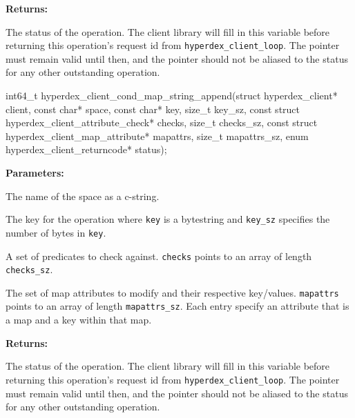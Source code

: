 \noindent\textbf{Returns:}
\begin{description}[labelindent=\widthof{{\texttt{status}}},leftmargin=*,noitemsep,nolistsep,align=right]
\item[\texttt{status}] The status of the operation.  The client library will fill in this variable before returning this operation's request id from \texttt{hyperdex\_client\_loop}.  The pointer must remain valid until then, and the pointer should not be aliased to the status for any other outstanding operation.
\end{description}

\funcsep
{}
\begin{ccode}
int64_t hyperdex_client_cond_map_string_append(struct hyperdex_client* client,
                const char* space,
                const char* key, size_t key_sz,
                const struct hyperdex_client_attribute_check* checks, size_t checks_sz,
                const struct hyperdex_client_map_attribute* mapattrs, size_t mapattrs_sz,
                enum hyperdex_client_returncode* status);
\end{ccode}
\funcdesc 

\noindent\textbf{Parameters:}
\begin{description}[labelindent=\widthof{{\texttt{mapattrs}, \texttt{mapattrs\_sz}}},leftmargin=*,noitemsep,nolistsep,align=right]
\item[\texttt{space}] The name of the space as a c-string.
\item[\texttt{key}, \texttt{key\_sz}] The key for the operation where \texttt{key} is a bytestring and \texttt{key\_sz} specifies the number of bytes in \texttt{key}.
\item[\texttt{checks}, \texttt{checks\_sz}] A set of predicates to check against.  \texttt{checks} points to an array of length \texttt{checks\_sz}.
\item[\texttt{mapattrs}, \texttt{mapattrs\_sz}] The set of map attributes to modify and their respective key/values.  \texttt{mapattrs} points to an array of length \texttt{mapattrs\_sz}.  Each entry specify an attribute that is a map and a key within that map.
\end{description}

\noindent\textbf{Returns:}
\begin{description}[labelindent=\widthof{{\texttt{status}}},leftmargin=*,noitemsep,nolistsep,align=right]
\item[\texttt{status}] The status of the operation.  The client library will fill in this variable before returning this operation's request id from \texttt{hyperdex\_client\_loop}.  The pointer must remain valid until then, and the pointer should not be aliased to the status for any other outstanding operation.
\end{description}

